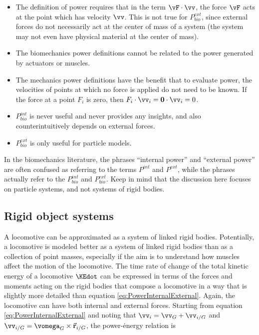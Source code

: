 \begin{itemize}
\item The definition of power requires that in the term $\vF \cdot \vv$, the
    force $\vF$ acts at the point which has velocity $\vv$. This is not true
    for $P_{bio}^{ext}$, since external forces do not necessarily act at the
    center of mass of a system (the system may not even have physical material
    at the center of mass).
\item The biomechanics power definitions cannot be related to the power
    generated by actuators or muscles.
\item The mechanics power definitions have the benefit that to evaluate power,
    the velocities of points at which no force is applied do not need to be
    known. If the force at a point $F_{i}$ is zero, then $F_{i}\cdot\vv_{i} = \mathbf{0} \cdot \vv_{i} =
    0$.
\item $P_{bio}^{int}$ is never useful and never provides any insights, and also counterintuitively depends on external forces.
\item $P_{bio}^{ext}$ is only useful for particle models.
\end{itemize}

In the biomechanics literature, the phrases ``internal power'' and ``external
power'' are often confused as referring to the terms $P^{int}$ and $P^{ext}$,
while the phrases actually refer to the $P_{bio}^{int}$ and $P_{bio}^{ext}$.
Keep in mind that the discussion here focuses on particle systems, and not
systems of rigid bodies.

\subsection*{Rigid object systems}

A locomotive can be approximated as a system of linked rigid bodies. Potentially, a locomotive is modeled better as a system of linked rigid bodies than as a collection of point masses, especially if the aim is to understand how muscles affect the motion of the locomotive. The time rate of change of the total kinetic energy of a locomotive $\KEdot$ can be expressed in terms of the forces and moments acting on the rigid bodies that compose a locomotive in a way that is slightly more detailed than equation \ref{eq:PowerInternalExternal}.  Again, the locomotive can have both internal and external forces. Starting from equation \ref{eq:PowerInternalExternal} and noting that $\vv_i = \vv_{G} + \vv_{i/G}$ and $\vv_{i/G} = \vomega_{G} \times \vec{\mathbf{r}}_{i/G}$, the power-\.{energy} relation is

